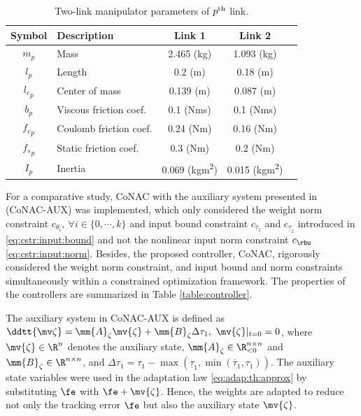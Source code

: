 \documentclass[final,5p,times,twocolumn,authoryear]{elsarticle}
\begin{document}
\begin{table}[t]
    \renewcommand{\arraystretch}{1.3}
    \caption{Two-link manipulator parameters of $p\textsuperscript{th}$ link.}
    \centering
    \begin{tabular}{c m{6.5em} c c c }
    \hline
    \textbf{Symbol} & \textbf{Description} & \textbf{Link 1} & \textbf{Link 2} \\
    \hline
    \hline 
    $m_p$ & Mass & 2.465 (kg) & 1.093 (kg) \\
    \hline
    $l_p$  & Length & 0.2 (m) & 0.18 (m) \\
    \hline
    ${l_c}_p$ & Center of mass & 0.139 (m) & 0.087 (m) \\
    \hline
    $b_p$   & Viscous friction coef. &  0.1 (Nms) & 0.1 (Nms) \\
    \hline
    ${f_c}_p$  & Coulomb friction coef. &  0.24 (Nm) & 0.16 (Nm) \\
    \hline
    ${f_s}_p$  & Static friction coef. &  0.3 (Nm) & 0.2 (Nm) \\
    \hline
    $I_p$  & Inertia & 0.069 (kgm\textsuperscript{2}) & 0.015 (kgm\textsuperscript{2}) \\
    \hline
    \end{tabular}
    \label{table:system:params}
\end{table}

For a comparative study, CoNAC with the auxiliary system presented in \cite{Esfandiari:2014aa,Karason:1994aa,Esfandiari:2015aa} (CoNAC-AUX) was implemented, which only considered the weight norm constraint $c_{\theta_i},\ \forall i\in\{0,\cdots,k\}$ and input bound constraint $c_{\overline\tau_1}$ and $c_{\underline\tau_1}$ introduced in \eqref{eq:cstr:input:bound} and not the nonlinear input norm constraint $c_{\rbu}$ \eqref{eq:cstr:input:norm}.
Besides, the proposed controller, CoNAC, rigorously considered the weight norm constraint, and input bound and norm constraints simultaneously within a constrained optimization framework. 
The properties of the controllers are summarized in Table \ref{table:controller}.

The auxiliary system in CoNAC-AUX is defined as $\ddtt{\mv\zeta} = \mm{A}_\zeta \mv{\zeta} + \mm{B}_\zeta \Delta\tau_{1},\ \mv{\zeta}\vert_{t=0} = 0$, where $\mv{\zeta}\in\R^n$ denotes the auxiliary state, $\mm{A}_\zeta\in\R_{<0}^{n\times n}$ and $\mm{B}_\zeta\in\R^{n\times n}$, and $\Delta\tau_{1} = 
\tau_{1}-\max(\underline\tau_1,\min(\overline\tau_1,\tau_1))$.
The auxiliary state variables were used in the adaptation law \eqref{eq:adap:th:approx} by substituting $\fe$ with $\fe+\mv{\zeta}$.
Hence, the weights are adapted to reduce not only the tracking error $\fe$ but also the auxiliary state $\mv{\zeta}$.
\end{document}
